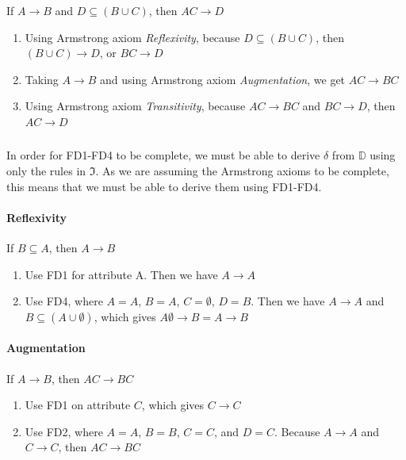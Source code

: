 \documentclass[letterpaper]{article}
\theoremstyle{plain}
\theoremstyle{definition}
\theoremstyle{remark}
\begin{document}
\subsubsection{}
\begin{center}
    If $A\rightarrow B$ and $D\subseteq(B\cup C)$, then $AC\rightarrow D$
\end{center}
\begin{enumerate}
    \item Using Armstrong axiom \textit{Reflexivity}, because $D\subseteq(B\cup C)$, then $(B\cup C)\rightarrow D$, or $BC \rightarrow D$
    \item Taking $A\rightarrow B$ and using Armstrong axiom \textit{Augmentation}, we get $AC\rightarrow BC$
    \item Using Armstrong axiom \textit{Transitivity}, because $AC\rightarrow BC$ and $BC \rightarrow D$, then $AC\rightarrow D$
\end{enumerate}
\subsubsection{}
In order for FD1-FD4 to be complete, we must be able to derive $\delta$ from $\mathbb{D}$ using only the rules in $\mathfrak{I}$. As we are assuming the Armstrong axioms to be complete, this means that we must be able to derive them using FD1-FD4.
\paragraph{Reflexivity}
\begin{center}
    If $B\subseteq A$, then $A\rightarrow B$
\end{center}
\begin{enumerate}
    \item Use FD1 for attribute A. Then we have $A\rightarrow A$
    \item Use FD4, where $A=A$, $B=A$, $C=\emptyset$, $D=B$. Then we have $A\rightarrow A$ and $B\subseteq (A\cup \emptyset)$, which gives $A\emptyset\rightarrow B=A\rightarrow B$ 
\end{enumerate}
\paragraph{Augmentation}
\begin{center}
    If $A\rightarrow B$, then $AC\rightarrow BC$
\end{center}
\begin{enumerate}
    \item Use FD1 on attribute $C$, which gives $C\rightarrow C$
    \item Use FD2, where $A=A$, $B=B$, $C=C$, and $D=C$. Because $A\rightarrow A$ and $C\rightarrow C$, then $AC\rightarrow BC$
\end{enumerate}
\end{document}
